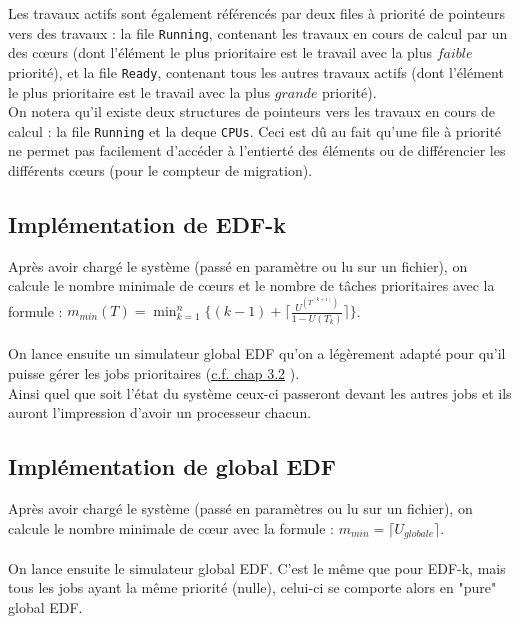 \documentclass[a4paper,10pt]{article}
\begin{document}
		Les travaux actifs sont également référencés par deux files à priorité de pointeurs vers des travaux : la file \verb?Running?, contenant les 				travaux en cours de calcul par un des cœurs (dont l'élément le plus prioritaire est le travail avec la plus $faible$ priorité), et la file 					\verb?Ready?, contenant tous les autres travaux actifs (dont l'élément le plus prioritaire est le travail avec la plus $grande$ priorité).\\

		On notera qu'il existe deux structures de pointeurs vers les travaux en cours de calcul : la file \verb?Running? et la deque \verb?CPUs?. Ceci est 			dû au fait qu'une file à priorité ne permet pas facilement d'accéder à l'entierté des éléments ou de différencier les différents cœurs (pour le 			compteur de migration).
		
		
	\subsection{Implémentation de EDF-k}
		Après avoir chargé le système (passé en paramètre ou lu sur un fichier), on calcule le nombre minimale de cœurs et le nombre de tâches prioritaires avec la formule : $ m_{min}(T) = \min_{k=1}^n \{  (k-1) + \lceil \frac{U^{(T^{(k+1)})}}{1- U(T_k)}  \rceil \} $.\\
		~\\
		On lance ensuite un simulateur global EDF qu'on a légèrement adapté pour qu'il puisse gérer les jobs prioritaires (\hyperlink{prioriteEDFk}{c.f. chap 3.2} ).\\
		Ainsi quel que soit l'état du système ceux-ci passeront devant les autres jobs et ils auront l'impression d'avoir un processeur chacun.
		
		
	\subsection{Implémentation de global EDF}
		Après avoir chargé le système (passé en paramètres ou lu sur un fichier), on calcule le nombre minimale de cœur avec la formule : $ m_{min} =\lceil 		U_{globale} \rceil$.\\
		~\\
		On lance ensuite le simulateur global EDF. C'est le même que pour EDF-k, mais tous les jobs ayant la même priorité (nulle), celui-ci se comporte alors en "pure" global EDF.
\end{document}
